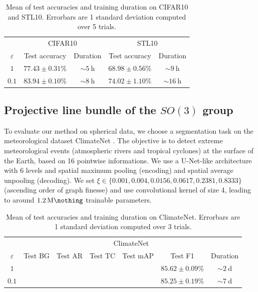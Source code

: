 \documentclass{article}
\begin{document}
\begin{table}[h!]
\centering 
\caption{Mean of test accuracies and training duration on CIFAR10 and STL10. Errorbars are 1 standard deviation computed over 5 trials.}
\begin{tabular}{c c c c c}
\toprule
 & \multicolumn{2}{c}{CIFAR10} & \multicolumn{2}{c}{STL10} \\
$\varepsilon$ & Test accuracy & Duration & Test accuracy & Duration \\
\midrule
$1$ & $77.43 \pm 0.31 \%$ & $\sim \SI{5}{\hour}$ & $68.98 \pm 0.56 \%$ & $\sim \SI{9}{\hour}$ \\
$0.1$ & $\boldsymbol{83.94 \pm 0.10 \%}$ & $\sim \SI{8}{\hour}$ & $\boldsymbol{74.02 \pm 1.10 \%}$ & $\sim \SI{16}{\hour}$ \\
\bottomrule
\end{tabular}
\end{table}

\subsection{Projective line bundle of the $SO(3)$ group}

To evaluate our method on spherical data, we choose a segmentation task on the meteorological dataset ClimateNet \citep{kashinath2021climatenet}. The objective is to detect extreme meteorological events (atmospheric rivers and tropical cyclones) at the surface of the Earth, based on 16 pointwise informations. We use a U-Net-like architecture \citep{ronneberger2015u} with 6 levels and spatial maximum pooling (encoding) and spatial average unpooling (decoding). We set $\xi \in \{0.001, 0.004, 0.0156, 0.0617, 0.2381, 0.8333\}$ (ascending order of graph finesse) and use convolutional kernel of size 4, leading to around $\SI{1.2}{\mega \nothing}$ trainable parameters. 

\begin{table}[h!]
\centering 
\caption{Mean of test accuracies and training duration on ClimateNet. Errorbars are 1 standard deviation computed over 3 trials.}
\begin{tabular}{c c c c c c c}
\toprule
 & \multicolumn{6}{c}{ClimateNet} \\
$\varepsilon$ & Test BG & Test AR & Test TC & Test mAP & Test F1 & Duration \\
\midrule
$1$ & & & & & $\boldsymbol{85.62 \pm 0.09 \%}$ & $\sim \SI{2}{\day}$ \\
$0.1$ & & & & & $85.25 \pm 0.19 \%$ & $\sim \SI{7}{\day}$ \\
\bottomrule
\end{tabular}
\end{table}
\end{document}
